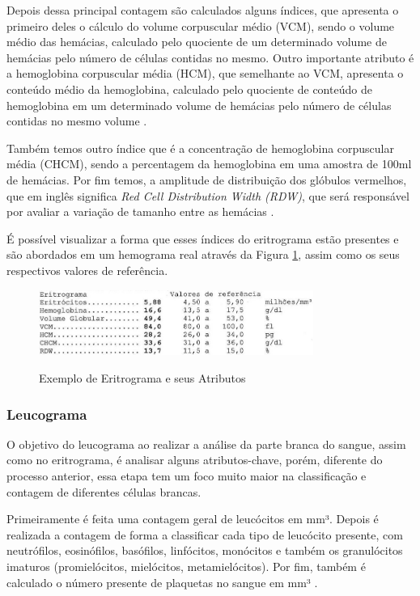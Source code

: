 Depois dessa principal contagem são calculados alguns índices, que apresenta o primeiro deles o cálculo do volume corpuscular médio (VCM), sendo o volume médio das hemácias, calculado pelo quociente de um determinado volume de hemácias pelo número de células contidas no mesmo. Outro importante atributo é a hemoglobina corpuscular média (HCM), que semelhante ao VCM, apresenta o conteúdo médio da hemoglobina, calculado pelo quociente de conteúdo de hemoglobina em um determinado volume de hemácias pelo número de células contidas no mesmo volume \cite{interpretacaoHemograma, manualHematologia}.

Também temos outro índice que é a concentração de hemoglobina corpuscular média (CHCM), sendo a percentagem da hemoglobina em uma amostra de 100ml de hemácias. Por fim temos, a amplitude de distribuição dos glóbulos vermelhos, que em inglês significa \emph{Red Cell Distribution Width (RDW)}, que será responsável por avaliar a variação de tamanho entre as hemácias \cite{interpretacaoHemograma, manualHematologia}.

É possível visualizar a forma que esses índices do eritrograma estão presentes e são abordados em um hemograma real através da Figura \ref{fig:eritrograma}, assim como os seus respectivos valores de referência.

\begin{figure}[!htb]
	\centering
	\caption{Exemplo de Eritrograma e seus Atributos}
	\includegraphics[width=0.80\textwidth]{img/eritrograma.jpg}
	\label{fig:eritrograma}
\end{figure}
 
\subsubsection{Leucograma}
O objetivo do leucograma ao realizar a análise da parte branca do sangue, assim como no eritrograma, é analisar alguns atributos-chave, porém, diferente do processo anterior, essa etapa tem um foco muito maior na classificação e contagem de diferentes células brancas.

Primeiramente é feita uma contagem geral de leucócitos em mm³. Depois é realizada a contagem de forma a classificar cada tipo de leucócito presente, com neutrófilos, eosinófilos, basófilos, linfócitos, monócitos e também os granulócitos imaturos (promielócitos, mielócitos, metamielócitos). Por fim, também é calculado o número presente de plaquetas no sangue em mm³ \cite{interpretacaoHemograma, manualHematologia}.

